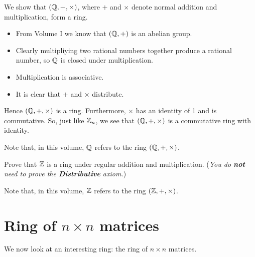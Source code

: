 \begin{example}
    We show that $(\mathbb{Q}, +, \times)$, where $+$ and $\times$ denote normal addition and multiplication, form a ring.
    \begin{itemize}
        \item From Volume I we know that $(\mathbb{Q}, +)$ is an abelian group.
        \item Clearly multipliying two rational numbers together produce a rational number, so $\mathbb{Q}$ is closed under multiplication.
        \item Multiplication is associative.
        \item It is clear that $+$ and $\times$ distribute.
    \end{itemize}
    Hence $(\mathbb{Q}, +, \times)$ is a ring. Furthermore, $\times$ has an identity of 1 and is commutative. So, just like $\mathbb{Z}_{n}$, we see that $(\mathbb{Q}, +, \times)$ is a commutative ring with identity.

    Note that, in this volume, $\mathbb{Q}$ refers to the ring $(\mathbb{Q}, +, \times)$.
\end{example}

\begin{exercise}
    Prove that $\mathbb{Z}$ is a ring under regular addition and multiplication.\newline
    (\textit{You do \textbf{not} need to prove the \textbf{Distributive} axiom.})
\end{exercise}
Note that, in this volume, $\mathbb{Z}$ refers to the ring $(\mathbb{Z}, +, \times)$.

\section{Ring of $n \times n$ matrices}
We now look at an interesting ring: the ring of $n \times n$ matrices.

